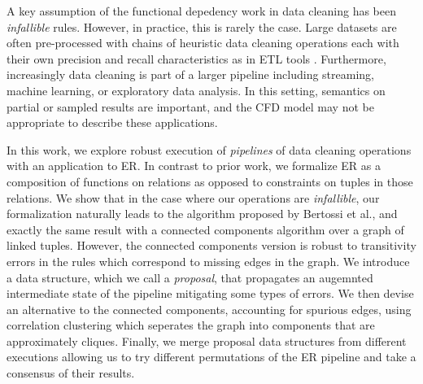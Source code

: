 A key assumption of the functional depedency work in data cleaning has been \emph{infallible} rules.
However, in practice, this is rarely the case.
Large datasets are often pre-processed with chains of heuristic data cleaning operations each with their own precision and recall characteristics as in ETL tools \cite{herzog2007data}.
Furthermore, increasingly data cleaning is part of a larger pipeline including streaming, machine learning, or exploratory data analysis.
In this setting, semantics on partial or sampled results are important, and the CFD model may not be appropriate to describe these applications.

In this work, we explore robust execution of \emph{pipelines} of data cleaning operations with an application to ER.
In contrast to prior work, we formalize ER as a composition of functions on relations as opposed to constraints on tuples in those relations.
We show that in the case where our operations are \emph{infallible}, our formalization naturally leads to the algorithm proposed by Bertossi et al., and exactly the same result with a connected components algorithm over a graph of linked tuples.
However, the connected components version is robust to transitivity errors in the rules which correspond to missing edges in the graph.
We introduce a data structure, which we call a \emph{proposal},  that propagates an augemnted intermediate state of the pipeline mitigating some types of errors.
We then devise an alternative to the connected components, accounting for spurious edges, using correlation clustering which seperates the graph into components that are approximately cliques.
Finally, we merge proposal data structures from different executions allowing us to try different permutations of the ER pipeline and take a consensus of their results.









